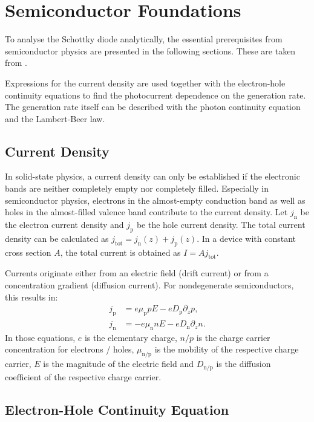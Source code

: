 \section{Semiconductor Foundations}
\label{sec:theory_basics}

To analyse the Schottky diode analytically, the essential prerequisites from
semiconductor physics are presented in the following sections. These are taken from
.

Expressions for the current density are used together with the electron-hole
continuity equations to find the photocurrent dependence on the generation rate. The
generation rate itself can be described with the photon continuity equation and the
Lambert-Beer law.

\subsection{Current Density}
\label{sec:current_density}

In solid-state physics, a current density can only be established if the electronic
bands are neither completely empty nor completely filled. Especially in
semiconductor physics, electrons in the almost-empty conduction band as well as holes
in the almost-filled valence band contribute to the current density. Let
$j_{\mathrm{n}}$ be the electron current density and $j_{\mathrm{p}}$ be the
hole current density. The total current density can be calculated as $j_{\mathrm{tot}}
= j_{\mathrm{n}}(z) + j_{\mathrm{p}}(z)$. In a device with constant cross
section $A$, the total current is obtained as $I=A j_{\mathrm{tot}}$.

Currents originate either from an electric field (drift current) or from a concentration
gradient (diffusion current). For nondegenerate semiconductors, this results in:
\begin{align}
	j_{\mathrm{p}} & = e \mu_{\mathrm{p}}p E - e D_{\mathrm{p}}\partial_{z}p, \label{eq:j_p}  \\
	j_{\mathrm{n}} & = -e \mu_{\mathrm{n}}n E - e D_{\mathrm{n}}\partial_{z}n. \label{eq:j_n}
\end{align}
In those equations, $e$ is the elementary charge, $n / p$ is the charge carrier
concentration for electrons / holes, $\mu_{\mathrm{n/p}}$ is the mobility of the respective
charge carrier, $E$ is the magnitude of the electric field and
$D_{\mathrm{n/p}}$ is the diffusion coefficient of the respective charge carrier.

\subsection{Electron-Hole Continuity Equation}
\label{sec:continuity}

